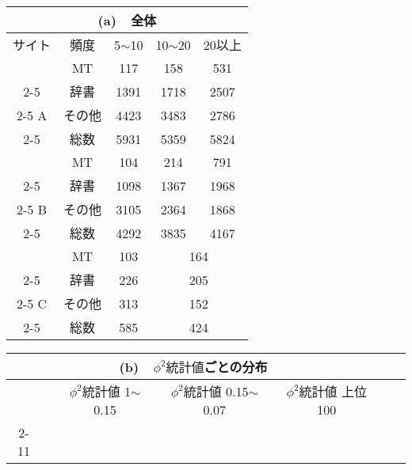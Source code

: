 \begin{table*}
\begin{center}
 \caption{評価用英語ターム数の分布}
 \label{tb:03}
{\footnotesize
  \begin{tabular}{|c|c||c|c|c|}
    \multicolumn{5}{c}{(a)\ \  全体} \\ \hline
サイト &   頻度  & 5$\sim$10  & 10$\sim$20 & 20以上 \\ \hline\hline
&   MT    & 117   & 158   & 531   \\ \cline{2-5}
&   辞書  & 1391  & 1718  & 2507  \\ \cline{2-5}
A & その他    & 4423  & 3483  & 2786 \\ \cline{2-5}
&   総数  & 5931  & 5359  & 5824  \\ \hline\hline
   &   MT    & 104   & 214   & 791   \\ \cline{2-5}
&   辞書  & 1098  &  1367 & 1968  \\ \cline{2-5}
B &   その他    & 3105  & 2364  & 1868  \\ \cline{2-5}
&   総数  & 4292  & 3835  & 4167  \\ \hline\hline
   &   MT    & 103   & \multicolumn{2}{|c|}{164} \\ \cline{2-5}
&   辞書  &  226  &   \multicolumn{2}{|c|}{205} \\ \cline{2-5}
C &その他  &  313  &  \multicolumn{2}{|c|}{152} \\ \cline{2-5}
&   総数 &  585  &  \multicolumn{2}{|c|}{424} \\ \hline
  \end{tabular}

\vspace*{.3cm}

  \begin{tabular}{|c|c||c|c|c||c|c|c||c|c|c|c|c|}
\multicolumn{11}{c}{(b)\ \ $\phi^2統計値$ごとの分布} \\
   \hline
&    & \multicolumn{3}{|c||}{$\phi^2統計値$ 1$\sim$0.15}
   & \multicolumn{3}{|c||}{$\phi^2統計値$ 0.15$\sim$0.07}
   & \multicolumn{3}{|c|}{$\phi^2統計値$ 上位100} \\ \cline{2-11}


\end{tabular}}
\end{center}
\end{table*}
